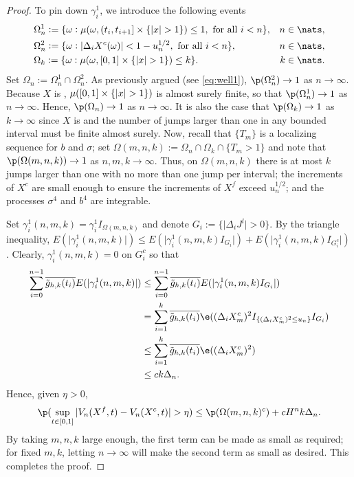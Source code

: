 \begin{proof}
To pin down $\gamma^1_i$, we introduce the following events
\begin{align}
&\Omega_n^1 := \{\omega : \mu(\omega,  (t_i, t_{i+1}] \times \{\vert x \vert > 1\} ) \le 1, \text{ for all } i <n  \}, & n \in \nats, \notag\\
&\Omega_n^2 := \{ \omega: \vert\Delta_i X^c(\omega)\vert <   1-  u_n^{1/2} , \text{ for all }i < n   \},& n \in \nats,\notag\\
&\Omega_k := \{\omega : \mu(\omega, \domain  \times \{\vert x \vert > 1\} ) \le k \}.  & k \in \nats.\notag
  \label{}
\end{align}
Set $\Omega_n := \Omega_n^1 \cap \Omega_n^2$.  As previously argued (see \eqref{eq:well1}), $\p(\Omega^2_n) \to 1$ as $n \to \infty$.  Because $X$ is \cadlag, $\mu(  [0,1] \times \{\vert x \vert > 1\} ) $ is almost surely finite, so that  $\p(\Omega^1_n) \to 1$ as $n \to \infty$.    Hence, $\p(\Omega_n) \to 1$ as $n \to \infty$. It is also the case that $\p(\Omega_k) \to 1$ as $k \to \infty$ since $X$ is \cadlag and the number of jumps larger than one in any bounded interval must be finite almost surely. Now, recall that $\{T_m \}$ is a localizing sequence for $b$ and $\sigma$;  set $\Omega(m,n,k) := \Omega_n \cap \Omega_k \cap \{T_m > 1\}$ and note that $\p(\Omega(m,n,k)) \to 1$ as $n,m, k \to \infty$.  Thus, on $\Omega(m,n,k)$ there is at most $k$ jumps larger than  one with no more than one  jump per interval; the increments of $X^c$ are small enough to ensure the increments of $X^f$ exceed $u_n^{1/2}$; and the processes $\sigma^4$ and $b^4$ are integrable. 

Set $\gamma^1_i(n, m, k) = \gamma^1_i I_{\Omega(m,n,k)}$  and  denote  $G_i := \{\vert \Delta_i J^l\vert  > 0\}$. By the triangle  inequality,  $E(\vert \gamma_i^1(n, m, k) \vert) \le E(\vert \gamma_i^1(n, m, k)  I_{G_i}\vert)  + E(\vert \gamma_i^1(n,m, k) I_{G^c_i}\vert)$. Clearly, $\gamma^1_i(n,m, k) = 0$ on $G^c_i$  so that 
\begin{align}
\sum_{i =0}^{n-1} \btghki E(\vert \gamma_i^1(n,m, k) \vert) & \le\sum_{i =0}^{n-1} \btghki E(\vert \gamma_i^1(n,m, k) I_{G_i}\vert) \notag\\
 & =  \sum_{i =1}^{k} \btghki\e( (\dxc_m)^2 I_{\{(\dxc_m)^2 \le u_n\}}I_{G_i})\notag\\
 &\le \sum_{i =1}^{k} \btghki\e((\dxc_m)^2)\notag \\
 &\le c k \Delta_n\notag.
  \label{}
\end{align}
Hence, given $\eta > 0$, 
\begin{align}
  \p(\sup_{t \in \domain} \vert V_n(X^f,t)  - V_n(X^c, t) \vert > \eta) \le \p(\Omega(m,n,k)^c) + c H^n k \Delta_n.\notag
  \label{}
\end{align}
By taking $m,n,k$ large enough, the first term can be made as small as required; for fixed $m,k$, letting $n\to \infty$ will make the second term as small as desired. This completes the proof. 
\end{proof}
